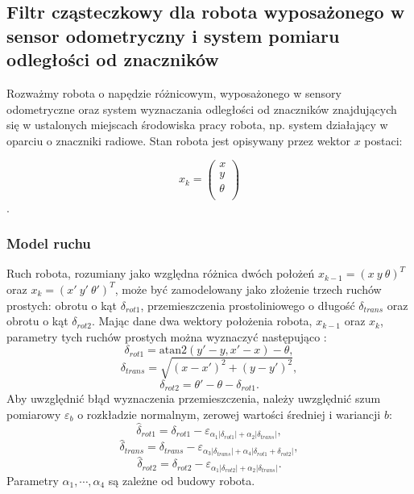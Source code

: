 \subsection{Filtr cząsteczkowy dla robota wyposażonego w sensor odometryczny i system pomiaru odległości od znaczników}
Rozważmy robota o napędzie różnicowym, wyposażonego w sensory odometryczne oraz system wyznaczania odległości od znaczników znajdujących się w ustalonych miejscach środowiska pracy robota, np. system działający w oparciu o znaczniki radiowe. Stan robota jest opisywany przez wektor $x$ postaci:

\begin{equation}
\label{eq:x_wektor}
x_{k} = \left( \begin{array}{c} 
x \\
y \\
\theta \\
\end{array} \right) 
\end{equation}.

\subsubsection{Model ruchu}

Ruch robota, rozumiany jako względna różnica dwóch położeń $x_{k-1} = (x \ y \ \theta)^T$ oraz $x_k = (x' \ y' \ \theta')^T$, może być zamodelowany jako złożenie trzech ruchów prostych: obrotu o kąt  $\delta_{rot1}$, przemieszczenia prostoliniowego o długość $\delta_{trans}$ oraz obrotu o kąt $\delta_{rot2}$. Mając dane dwa wektory położenia robota, $x_{k-1}$ oraz $x_k$, parametry tych ruchów prostych można wyznaczyć następująco \cite{probabilistic_robotics}:
\begin{equation}
 \delta_{rot1} = \mathrm{atan2} (y' - y, x'-x) - \theta,
\end{equation}
\begin{equation}
 \delta_{trans} = \sqrt{(x-x')^2+(y-y')^2},
\end{equation}
\begin{equation}
 \delta_{rot2} = \theta' - \theta - \delta_{rot1}.
\end{equation}
Aby uwzględnić błąd wyznaczenia przemieszczenia, należy uwzględnić szum pomiarowy $\varepsilon_b$ o rozkładzie normalnym, zerowej wartości średniej i wariancji $b$:
\begin{equation}
 \hat \delta_{rot1} = \delta_{rot1} - \varepsilon_{\alpha_1 |\delta_{rot1}|+\alpha_2 |\delta_{trans}|},
\end{equation}
\begin{equation}
 \hat \delta_{trans} = \delta_{trans} - \varepsilon_{\alpha_3 |\delta_{trans}|+\alpha_4 |\delta_{rot1} + \delta_{rot2}|},
\end{equation}
\begin{equation}
 \hat \delta_{rot2} = \delta_{rot2} - \varepsilon_{\alpha_1 |\delta_{rot2}|+\alpha_2 |\delta_{trans}|}.
\end{equation}
Parametry $\alpha_1, \cdots, \alpha_4$ są zależne od budowy robota.

